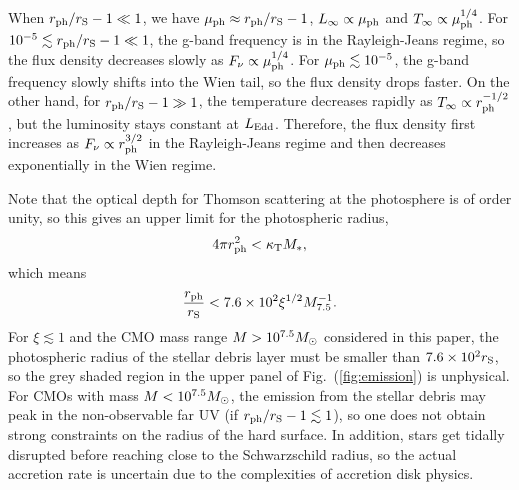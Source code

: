 \documentclass[useAMS,usenatbib]{mn2e}
\begin{document}
When $r_{\rm ph}/r_{\rm S} - 1\ll1$, we have $\mu_{\rm ph} \approx
r_{\rm ph}/r_{\rm S} - 1$, $L_{\rm \infty}\propto \mu_{\rm
  ph}$ and $T_{\infty}\propto \mu_{\rm ph}^{1/4}$. For
$10^{-5}\lesssim r_{\rm ph}/r_{\rm S} - 1\ll1$, the g-band frequency
is in the Rayleigh-Jeans regime, so the flux density decreases
slowly as $F_{\nu}\propto \mu_{\rm ph}^{1/4}$. For
$\mu_{\rm ph}\lesssim 10^{-5}$, the g-band frequency slowly shifts 
into the Wien tail, so the flux density drops faster. On
the other hand, for $r_{\rm ph}/r_{\rm S} - 1\gg1$, the temperature
decreases rapidly as $T_{\infty}\propto r_{\rm ph}^{-1/2}$, but the
luminosity stays constant at $L_{\rm Edd}$. Therefore, the flux
density first increases 
as $F_{\rm \nu} \propto r_{\rm ph}^{3/2}$ in the Rayleigh-Jeans regime and
then decreases exponentially in the Wien regime.

Note that the optical depth for Thomson scattering at the photosphere  
is of order unity, so this gives an upper limit for the
photospheric radius,
\begin{equation}
  \label{eq:35}
  4\pi r_{\rm ph}^2 < \kappa_{\rm T}M_{*},
\end{equation}
which means
\begin{equation}
  \label{eq:36}
  \frac{r_{\rm ph}}{r_{\rm S}}<7.6\times10^2\xi^{1/2} M_{7.5}^{-1}.
\end{equation}
For $\xi \lesssim 1$ and the CMO mass range
$M>10^{7.5}M_{\rm \odot}$  considered in this paper, the photospheric radius of the stellar debris 
layer must be smaller than $7.6\times10^2r_{\rm S}$, so the grey
shaded region in the upper panel of Fig.~(\ref{fig:emission}) is
unphysical. For CMOs with mass $M<10^{7.5}M_{\rm
  \odot}$, the emission from the stellar debris may peak in the
non-observable far UV (if $r_{\rm 
  ph}/r_{\rm S} - 1\lesssim1$), so one does not obtain strong constraints
on the radius of the hard surface. In addition, stars get tidally disrupted
before reaching close to the Schwarzschild radius, so the 
actual accretion rate is uncertain due to the complexities of
accretion disk physics.
\end{document}
